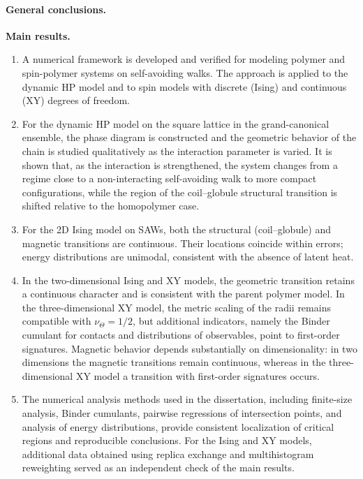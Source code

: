 \paragraph*{General conclusions.}

\medskip
\noindent\textbf{Main results.}
\begin{enumerate}
\item A numerical framework is developed and verified for modeling polymer and spin-polymer systems on self-avoiding walks. The approach is applied to the dynamic HP model and to spin models with discrete (Ising) and continuous (XY) degrees of freedom.
\item For the dynamic HP model on the square lattice in the grand-canonical ensemble, the phase diagram is constructed and the geometric behavior of the chain is studied qualitatively as the interaction parameter is varied. It is shown that, as the interaction is strengthened, the system changes from a regime close to a non-interacting self-avoiding walk to more compact configurations, while the region of the coil--globule structural transition is shifted relative to the homopolymer case.
	\item For the 2D Ising model on SAWs, both the structural (coil--globule) and magnetic transitions are continuous. Their locations coincide within errors; energy distributions are unimodal, consistent with the absence of latent heat.
\item In the two-dimensional Ising and XY models, the geometric transition retains a continuous character and is consistent with the parent polymer model. In the three-dimensional XY model, the metric scaling of the radii remains compatible with $\nu_{\Theta}=1/2$, but additional indicators, namely the Binder cumulant for contacts and distributions of observables, point to first-order signatures. Magnetic behavior depends substantially on dimensionality: in two dimensions the magnetic transitions remain continuous, whereas in the three-dimensional XY model a transition with first-order signatures occurs.
 \item The numerical analysis methods used in the dissertation, including finite-size analysis, Binder cumulants, pairwise regressions of intersection points, and analysis of energy distributions, provide consistent localization of critical regions and reproducible conclusions. For the Ising and XY models, additional data obtained using replica exchange and multihistogram reweighting served as an independent check of the main results.
\end{enumerate}


